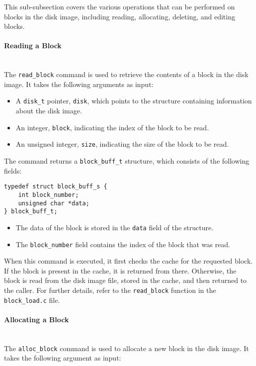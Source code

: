 \documentclass{article}
\begin{document}
This sub-subsection covers the various operations that can be performed on blocks in the disk image, including reading, allocating, deleting, and editing blocks.

\paragraph{Reading a Block}\mbox{}\\
The \texttt{read\_block} command is used to retrieve the contents of a block in the disk image. It takes the following arguments as input:

\begin{itemize}
    \item A \texttt{disk\_t} pointer, \texttt{disk}, which points to the structure containing information about the disk image.
    \item An integer, \texttt{block}, indicating the index of the block to be read.
    \item An unsigned integer, \texttt{size}, indicating the size of the block to be read.
\end{itemize}

The command returns a \texttt{block\_buff\_t} structure, which consists of the following fields:

\begin{lstlisting}[style=cstyle]
typedef struct block_buff_s {
    int block_number;
    unsigned char *data;
} block_buff_t;
\end{lstlisting}

\begin{itemize}
    \item The data of the block is stored in the \texttt{data} field of the structure.
    \item The \texttt{block\_number} field contains the index of the block that was read.
\end{itemize}

When this command is executed, it first checks the cache for the requested block. If the block is present in the cache, it is returned from there. Otherwise, the block is read from the disk image file, stored in the cache, and then returned to the caller. For further details, refer to the \texttt{read\_block} function in the \texttt{block\_load.c} file.

\paragraph{Allocating a Block}\mbox{}\\
The \texttt{alloc\_block} command is used to allocate a new block in the disk image. It takes the following argument as input:
\end{document}
